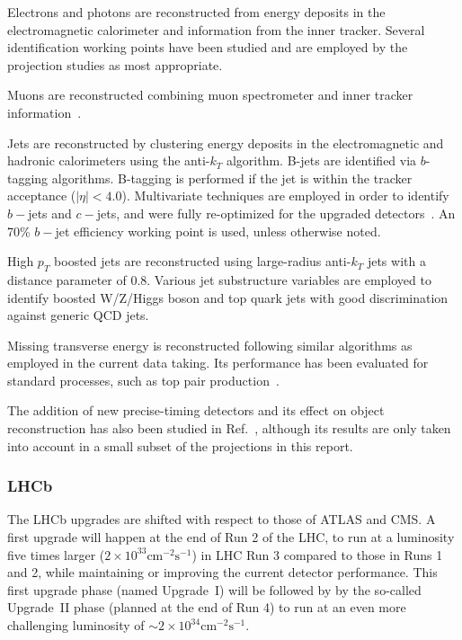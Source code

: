 Electrons and photons are reconstructed from energy deposits in the electromagnetic calorimeter and information from the inner tracker\cite{ATLAS_LAr_TDR,CMS_Barrel_TDR,CMS_HGCAL_TDR,CMS_MTD_TP}.
Several identification working points have been studied and are employed by the projection studies as most appropriate.

Muons are reconstructed combining muon spectrometer and inner tracker information~\cite{ATLAS_Muon_TDR,CMS_Muon_TDR}.

Jets are reconstructed by clustering energy deposits in the electromagnetic and hadronic calorimeters\cite{ATLAS_Tile_TDR,ATLAS_LAr_TDR,CMS_Barrel_TDR} using the anti-$k_{T}$ algorithm\cite{Cacciari:2008gp}.
B-jets are identified via $b$-tagging algorithms. B-tagging is performed if the jet is within the tracker acceptance ($|\eta|<4.0$).
Multivariate techniques are employed in order to identify $b-$jets and $c-$jets, and were fully re-optimized for the upgraded detectors~\cite{ATLAS_Pixel_TDR,CMS_Tracker_TDR}.
An 70\% $b-$jet efficiency working point is used, unless otherwise noted.

High $p_T$ boosted jets are reconstructed using large-radius anti-$k_{T}$ jets with a distance parameter of 0.8. Various jet substructure variables are employed to identify boosted W/Z/Higgs boson and top quark jets with good discrimination against generic QCD jets. 

Missing transverse energy is reconstructed following similar algorithms as employed in the current data taking.
Its performance has been evaluated for standard processes, such as top pair production~\cite{ATLAS_Pixel_TDR,Contardo:2020886}.

The addition of new precise-timing detectors and its effect on object reconstruction has also been studied in Ref.~\cite{ATLAS_TP_HGTD,CMS_MTD_TP}, although its results are only taken into account in a small subset of the projections in this report.

\subsubsection{LHCb}
\label{sec:methods:perf_LHCb}
The LHCb upgrades are shifted with respect to those of ATLAS and CMS. A first upgrade will happen at the end of Run 2 of the LHC, to run at a luminosity five times larger  ($2\times 10^{33}\text{cm}^{-2}\text{s}^{-1}$) in LHC Run 3 compared to those in Runs 1 and 2, while maintaining or improving the current detector performance. This first upgrade phase (named \mbox{Upgrade~I}) will be followed by by the so-called \mbox{Upgrade~II} phase (planned at the end of Run 4) to run at an even more challenging luminosity of $\sim 2\times 10^{34}\text{cm}^{-2}\text{s}^{-1}$.

